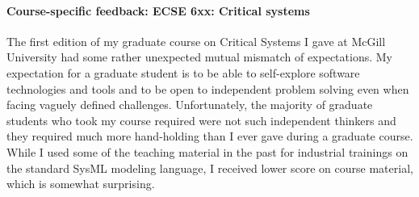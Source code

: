%
%
%


\paragraph{Course-specific feedback: ECSE 6xx: Critical systems}

The first edition of my graduate course on Critical Systems I gave at McGill University had some rather unexpected mutual mismatch of expectations. My expectation for a graduate student is to be able to self-explore software technologies and tools and to be open to independent problem solving even when facing vaguely defined challenges. Unfortunately, the majority of graduate students who took my course required were not such independent thinkers and they required much more hand-holding than I ever gave during a graduate course. While I used some of the teaching material in the past for industrial trainings on the standard SysML modeling language, I received lower score on course material, which is somewhat surprising.


